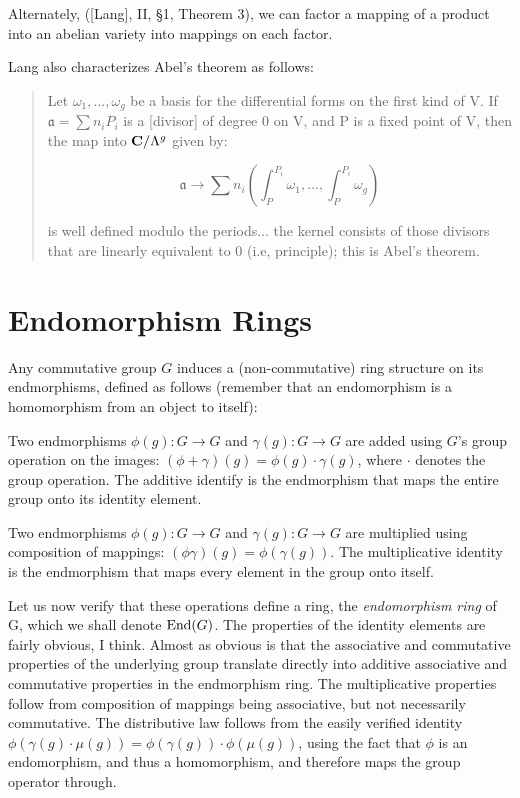 Alternately, ([Lang], II, \S1, Theorem 3), we can factor a mapping
of a product into an abelian variety into mappings on each factor.

Lang also characterizes Abel's theorem as follows:

\begin{quote}

Let $\omega_1, ..., \omega_g$ be a basis for the differential forms
on the first kind of V.  If $\mathfrak{a} = \sum n_i P_i$ is a
[divisor] of degree 0 on V, and P is a fixed point of V, then
the map into ${\bf C}/\Lambda^g$ given by:

$$\mathfrak{a} \to \sum n_i (\int_P^{P_i}\omega_1, ..., \int_P^{P_i}\omega_g)$$

is well defined modulo the periods... the kernel consists of those
divisors that are linearly equivalent to 0 (i.e, principle); this is
Abel's theorem.

\end{quote}


\section{Endomorphism Rings}

Any commutative group $G$ induces a (non-commutative) ring structure
on its endmorphisms, defined as follows (remember that an
endomorphism is a homomorphism from an object to itself):

Two endmorphisms $\phi(g): G \to G$ and $\gamma(g): G \to G$ are added
using $G$'s group operation on the images: $(\phi+\gamma)(g) =
\phi(g)\cdot\gamma(g)$, where $\cdot$ denotes the group operation.
The additive identify is the endmorphism that maps the entire group
onto its identity element.

Two endmorphisms $\phi(g): G \to G$ and $\gamma(g): G \to G$ are
multiplied using composition of mappings: $(\phi\gamma)(g) =
\phi(\gamma(g))$.  The multiplicative identity is the endmorphism that
maps every element in the group onto itself.

Let us now verify that these operations define a ring, the {\it endomorphism
ring} of G, which we shall denote ${\rm End}(G)$.  The properties
of the identity elements are fairly obvious, I think.  Almost as
obvious is that the associative and commutative properties of the
underlying group translate directly into additive associative and
commutative properties in the endmorphism ring.  The multiplicative
properties follow from composition of mappings being associative, but
not necessarily commutative.  The distributive law follows from the
easily verified identity $\phi(\gamma(g)\cdot\mu(g)) = \phi(\gamma(g)) \cdot
\phi(\mu(g))$, using the fact that $\phi$ is an endomorphism, and thus
a homomorphism, and therefore maps the group operator through.

